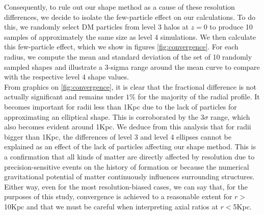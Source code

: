 Consequently, to rule out our shape method as a cause of these resolution differences, we decide to isolate the few-particle effect on our calculations. To do this, we randomly select DM particles from level 3 halos at $z=0$ to produce 10 samples of approximately the same size as level 4 simulations. We then calculate this few-particle effect, which we show in figures \ref{fig:convergence}. For each radius, we compute the mean and standard deviation of the set of 10 randomly sampled shapes and illustrate a 3-sigma range around the mean curve to compare with the respective level 4 shape values.\\  

From graphics on \ref{fig:convergence}, it is clear that the fractional difference is not actually significant and remains under $1\%$ for the majority of the radial profile. It becomes important for radii less than 1Kpc due to the lack of particles for approximating an elliptical shape. This is corroborated by the $3\sigma$ range, which also becomes evident around 1Kpc. We deduce from this analysis that for radii bigger than 1Kpc, the differences of level 3 and level 4 ellipses cannot be explained as an effect of the lack of particles affecting our shape method. This is a confirmation that all kinds of matter are directly affected by resolution due to precision-sensitive events on the history of formation or because the numerical gravitational potential of matter continuously influences surrounding structures. Either way, even for the most resolution-biased cases, we can say that, for the purposes of this study, convergence is achieved to a reasonable extent for $r>$10Kpc and that we must be careful when interpreting axial ratios at $r<$5Kpc. \\  

